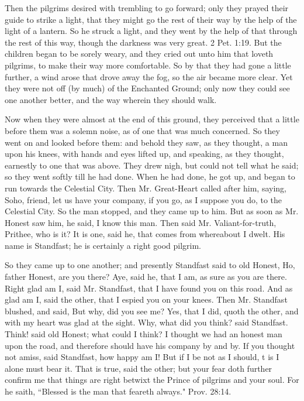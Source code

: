 Then the pilgrims desired with trembling to go forward; only they prayed their guide to strike a light, that they might go the rest of their way by the help of the light of a lantern. So he struck a light, and they went by the help of that through the rest of this way, though the darkness was very great. 2 Pet. 1:19. But the children began to be sorely weary, and they cried out unto him that loveth pilgrims, to make their way more comfortable. So by that they had gone a little further, a wind arose that drove away the fog, so the air became more clear. Yet they were not off (by much) of the Enchanted Ground; only now they could see one another better, and the way wherein they should walk.

Now when they were almost at the end of this ground, they perceived that a little before them was a solemn noise, as of one that was much concerned. So they went on and looked before them: and behold they saw, as they thought, a man upon his knees, with hands and eyes lifted up, and speaking, as they thought, earnestly to one that was above. They drew nigh, but could not tell what he said; so they went softly till he had done. When he had done, he got up, and began to run towards the Celestial City. Then Mr. Great-Heart called after him, saying, Soho, friend, let us have your company, if you go, as I suppose you do, to the Celestial City. So the man stopped, and they came up to him. But as soon as Mr. Honest saw him, he said, I know this man. Then said Mr. Valiant-for-truth, Prithee, who is it? It is one, said he, that comes from whereabout I dwelt. His name is Standfast; he is certainly a right good pilgrim.

So they came up to one another; and presently Standfast said to old Honest, Ho, father Honest, are you there? Aye, said he, that I am, as sure as you are there. Right glad am I, said Mr. Standfast, that I have found you on this road. And as glad am I, said the other, that I espied you on your knees. Then Mr. Standfast blushed, and said, But why, did you see me? Yes, that I did, quoth the other, and with my heart was glad at the sight. Why, what did you think? said Standfast. Think! said old Honest; what could I think? I thought we had an honest man upon the road, and therefore should have his company by and by. If you thought not amiss, said Standfast, how happy am I! But if I be not as I should, t is I alone must bear it. That is true, said the other; but your fear doth further confirm me that things are right betwixt the Prince of pilgrims and your soul. For he saith, ``Blessed is the man that feareth always." Prov. 28:14.

